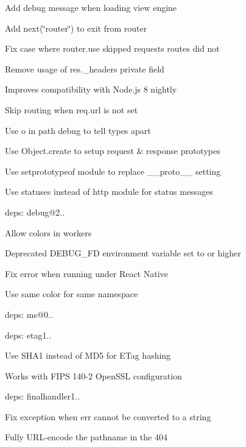 \begin{DoxyItemize}
\item Add debug message when loading view engine
\item Add {\ttfamily next(\char`\"{}router\char`\"{})} to exit from router
\item Fix case where {\ttfamily router.\+use} skipped requests routes did not
\item Remove usage of {\ttfamily res.\+\_\+headers} private field
\begin{DoxyItemize}
\item Improves compatibility with Node.\+js 8 nightly
\end{DoxyItemize}
\item Skip routing when {\ttfamily req.\+url} is not set
\item Use {\ttfamily o} in path debug to tell types apart
\item Use {\ttfamily Object.\+create} to setup request \& response prototypes
\item Use {\ttfamily setprototypeof} module to replace {\ttfamily \+\_\+\+\_\+proto\+\_\+\+\_\+} setting
\item Use {\ttfamily statuses} instead of {\ttfamily http} module for status messages
\item deps\+: debug@2..
\begin{DoxyItemize}
\item Allow colors in workers
\item Deprecated {\ttfamily D\+E\+B\+U\+G\+\_\+\+FD} environment variable set to {} or higher
\item Fix error when running under React Native
\item Use same color for same namespace
\item deps\+: ms@0..
\end{DoxyItemize}
\item deps\+: etag1..
\begin{DoxyItemize}
\item Use S\+H\+A1 instead of M\+D5 for E\+Tag hashing
\item Works with F\+I\+PS 140-\/2 Open\+S\+SL configuration
\end{DoxyItemize}
\item deps\+: finalhandler1..
\begin{DoxyItemize}
\item Fix exception when {\ttfamily err} cannot be converted to a string
\item Fully U\+R\+L-\/encode the pathname in the 404

\end{DoxyItemize}
\end{DoxyItemize}
